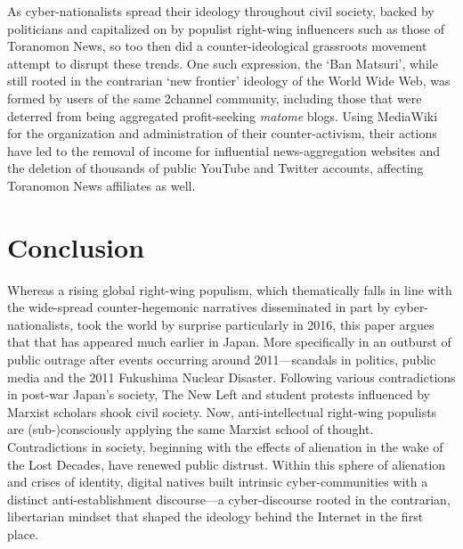 \documentclass[10pt,british,A4paper,oneside]{memoir}
\begin{document}
As cyber-nationalists spread their ideology throughout civil
society, backed by politicians and capitalized on by populist right-wing
influencers such as those of Toranomon News, so too then did a
counter-ideological grassroots movement attempt to disrupt these trends.
One such expression, the `Ban Matsuri', while still rooted in the
contrarian `new frontier' ideology of the World Wide Web, was formed by
users of the same 2channel community, including those that were deterred
from being aggregated profit-seeking \emph{matome} blogs. Using
MediaWiki for the organization and administration of their
counter-activism, their actions have led to the removal of income for
influential news-aggregation websites and the deletion of thousands of
public YouTube and Twitter accounts, affecting Toranomon News affiliates
as well.

\newpage

\chapter*{Conclusion}

Whereas a rising global right-wing populism, which thematically falls in
line with the wide-spread counter-hegemonic narratives disseminated in
part by cyber-nationalists, took the world by surprise particularly in
2016, this paper argues that that has appeared much earlier in Japan.
More specifically in an outburst of public outrage after events
occurring around 2011---scandals in politics, public media and the 2011
Fukushima Nuclear Disaster. Following various contradictions in post-war
Japan's society, The New Left and student protests influenced by Marxist
scholars shook civil society. Now, anti-intellectual right-wing
populists are (sub-)consciously applying the same Marxist school of
thought. Contradictions in society, beginning with the effects of
alienation in the wake of the Lost Decades, have renewed public
distrust. Within this sphere of alienation and crises of identity,
digital natives built intrinsic cyber-communities with a distinct
anti-establishment discourse---a cyber-discourse rooted in the
contrarian, libertarian mindset that shaped the ideology behind the
Internet in the first place.
\end{document}
